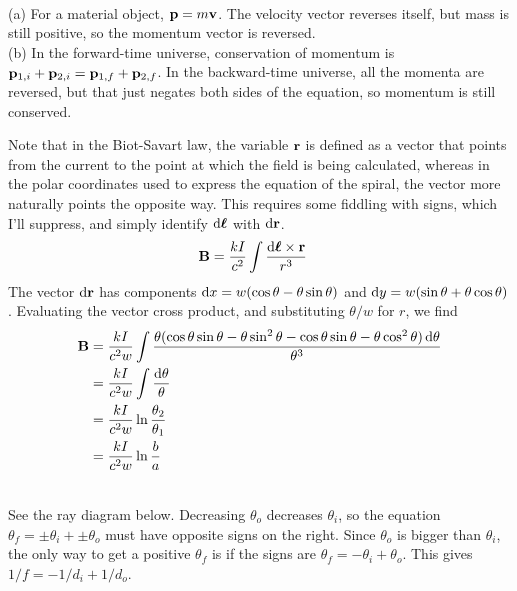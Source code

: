 \noindent{}\\
(a) For a material object, $\mathbf{p}=m\mathbf{v}$. The velocity vector reverses
itself, but mass is still positive, so the momentum vector is reversed.\\
(b) In the forward-time universe, conservation of momentum is
$\mathbf{p}_{1,i}+\mathbf{p}_{2,i}=\mathbf{p}_{1,f}+\mathbf{p}_{2,f}$. In the backward-time
universe, all the momenta are reversed, but that just negates both sides
of the equation, so momentum is still conserved.

Note that in the Biot-Savart law, the variable $\mathbf{r}$ is defined as a vector
that points from the current to the point at which the field is being calculated,
whereas in the polar coordinates used to express the equation of the spiral, the
vector more naturally points the opposite way. This requires some fiddling with
signs, which I'll suppress, and simply identify $\operatorname{d\!}\boldsymbol{\ell}$ with $\operatorname{d\!}\mathbf{r}$.
\begin{align*}
  \mathbf{B} &= \frac{kI}{c^2}\int \frac{\operatorname{d\!}\boldsymbol{\ell}\times\mathbf{r}}{r^3}
\end{align*}
The vector $\operatorname{d\!}\mathbf{r}$ has components $\operatorname{d\!} x=w(\cos\theta-\theta\sin\theta)$ and
$\operatorname{d\!} y=w(\sin\theta+\theta\cos\theta)$. Evaluating the vector cross product, and
substituting $\theta/w$ for $r$, we find
\begin{align*}
  \mathbf{B} &= \frac{kI}{c^2w}\int \frac{\theta(\cos\theta\sin\theta-\theta\sin^2\theta-\cos\theta\sin\theta-\theta\cos^2\theta)\operatorname{d\!}\theta}{\theta^3} \\
         &= \frac{kI}{c^2w}\int \frac{\operatorname{d\!}\theta}{\theta} \\
         &= \frac{kI}{c^2w}\ln\frac{\theta_2}{\theta_1} \\
         &= \frac{kI}{c^2w}\ln\frac{b}{a}
\end{align*}



\noindent{}\\
 See the ray diagram below. Decreasing $\theta_o$ decreases
$\theta_i$, so the equation $\theta_f=\pm\theta_i+\pm\theta_o$
must have opposite signs on the right. Since $\theta_o$ is bigger
than $\theta_i$, the only way to get a positive $\theta_f$ is if
the signs are $\theta_f=-\theta_i+\theta_o$.
This gives $1/f=-1/d_i+1/d_o$.


